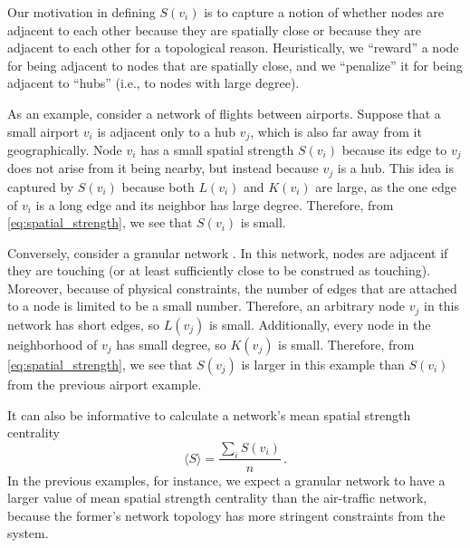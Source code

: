 \documentclass[%
 reprint,
 amsmath,amssymb,
 aps,
]{revtex4-1}
\begin{document}
Our motivation in defining $S(v_i)$ is to capture a notion of whether nodes are adjacent to each other because they are spatially close or because they are adjacent to each other for a topological reason. Heuristically, we ``reward'' a node for being adjacent to nodes that are spatially close, and we ``penalize'' it for being adjacent to ``hubs'' (i.e., to nodes with large degree).

As an example, consider a network of flights between airports. Suppose that a small airport $v_i$ is adjacent only to a hub $v_j$, which is also far away from it geographically. Node $v_i$ has a small spatial strength $S(v_i)$ because its edge to $v_j$ does not arise from it being nearby, but instead because $v_j$ is a hub. This idea is captured by $S(v_i)$ because both $L(v_i)$ and $K(v_i)$ are large, as the one edge of $v_i$ is a long edge and its neighbor has large degree.
Therefore, from \eqref{eq:spatial_strength}, we see that $S(v_i)$ is small.

Conversely, consider a granular network \cite{papa2018}. In this network, nodes are adjacent if they are touching (or at least sufficiently close to be construed as touching). Moreover, because of physical constraints, the number of edges that are attached to a node is limited to be a small number.
Therefore, an arbitrary node $v_j$ in this network has short edges, so $L(v_j)$ is small. Additionally, every node in the neighborhood of $v_j$ has small degree, so $K(v_j)$ is small. {\color{red}Therefore, from \eqref{eq:spatial_strength}, we see that $S(v_j)$ is larger in this example than $S(v_i)$ from the previous airport example. }



It can also be informative to calculate a network's mean spatial strength centrality
\begin{equation}
    \langle S \rangle = \frac{\sum_i S(v_i)}{n}\,.
\end{equation}
In the previous examples, for instance, we expect a granular network to have a larger value of mean spatial strength centrality than the air-traffic network, because the former's network topology has more stringent constraints from the system. %
\end{document}
